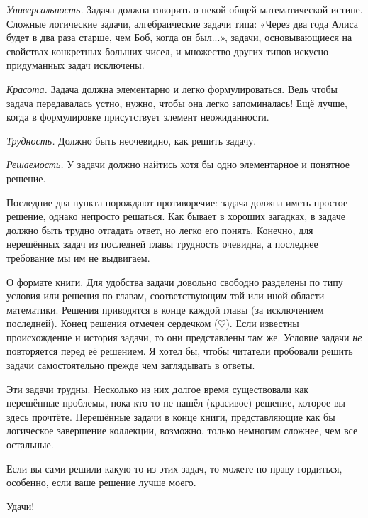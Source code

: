 \documentclass[twoside]{book}
\begin{document}
\textit{Универсальность.}
Задача должна говорить о некой общей математической истине.
Сложные логические задачи, алгебраические задачи типа:
«Через два года Алиса будет в два раза старше, чем Боб, когда он был...», задачи, основывающиеся на свойствах конкретных больших  чисел, и множество других типов искусно придуманных задач исключены.

\textit{Красота.}
Задача должна  элементарно и легко формулироваться.
Ведь чтобы задача передавалась устно, нужно, чтобы она легко запоминалась! Ещё лучше, когда в формулировке присутствует элемент неожиданности.

\textit{Трудность.}
Должно быть неочевидно, как решить задачу.

\textit{Решаемость.}
У задачи должно найтись хотя бы одно элементарное и понятное решение.

Последние два пункта порождают противоречие: задача должна иметь простое решение, однако непросто решаться.
Как бывает в хороших загадках, в задаче должно быть трудно отгадать ответ, но легко его понять.
Конечно, для нерешённых задач из последней главы трудность очевидна, а последнее требование мы им не выдвигаем.

О формате книги.
Для удобства задачи довольно свободно разделены по типу условия или решения по главам, соответствующим той или иной области математики.
Решения приводятся в конце каждой главы (за исключением последней).
Конец решения отмечен сердечком ($\heartsuit$).
Если известны происхождение и история задачи, то они представлены там же.
Условие задачи \emph{не} повторяется перед её решением.
Я хотел бы, чтобы читатели пробовали решить задачи самостоятельно прежде чем заглядывать в ответы.

Эти задачи трудны.
Несколько из них долгое время существовали как нерешённые проблемы, пока кто-то не нашёл (красивое) решение, которое вы здесь прочтёте.
Нерешённые задачи в конце книги, представляющие как бы логическое завершение коллекции, возможно, только немногим сложнее, чем все остальные.

Если вы сами решили какую-то из этих задач, то можете по праву гордиться, особенно, если ваше решение лучше моего.

Удачи!



\end{document}
